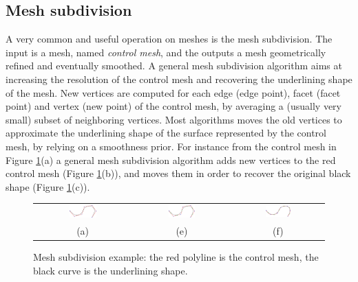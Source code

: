 \subsection{Mesh subdivision}
A very common and useful operation on meshes is the mesh subdivision.
The input is a mesh, named \emph{control mesh}, and the outputs a mesh geometrically refined and eventually smoothed.
A general mesh subdivision algorithm aims at increasing the resolution of the control mesh and recovering the underlining shape of the mesh.
New vertices are computed for each edge (edge point), facet (facet point) and vertex (new point) of the control mesh, by averaging a (usually very small) subset of neighboring vertices. 
Most algorithms moves the old vertices to approximate the underlining shape of the surface represented by the control mesh, by relying on a smoothness prior.
For instance from the control mesh in Figure \ref{fig:subdivision}(a) a general mesh subdivision algorithm adds new vertices to the red control mesh (Figure \ref{fig:subdivision}(b)), and moves them in order to recover the original black shape (Figure \ref{fig:subdivision}(c)).


\begin{figure}[tp]
\begin{center}
 \begin{tabular}{ccc}
  \includegraphics[width=0.3\textwidth]{./img/subdivision1d}&
  \includegraphics[width=0.3\textwidth]{./img/subdivision1d02}&
  \includegraphics[width=0.3\textwidth]{./img/subdivision1d03}\\
  (a)&(e)&(f)\\
 \end{tabular}
 \caption{Mesh subdivision example: the red polyline is the control mesh, the black curve is the underlining shape.}
 \label{fig:subdivision}
\end{center}
\end{figure}

